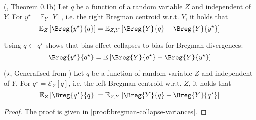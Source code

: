 \documentclass[../main.tex]{subfiles}
\begin{document}



\begin{lemma} \label{thm:bregman-collapse-bias} (\cite{pfau_GeneralizedBiasVarianceDecomposition_}, Theorem 0.1b)
    Let $q$ be a function of a random variable $Z$ and independent of $Y$. For $y^\star = \mathbb{E}_{Y}\left[ Y \right]$, i.e. the right Bregman centroid w.r.t. $Y$, it holds that
$$
\mathbb{E}_{Z}\left[ \Breg{y^\star}{q} \right]  = \mathbb{E}_{Z,Y}\left[ \Breg{Y}{q} - \Breg{Y}{y^\star} \right] 
$$
\end{lemma}

Using $q \gets q^\star$ shows that bias-effect collapses to bias for Bregman divergences: 
$$\Breg{y^\star}{q^\star} = \mathbb{E}_{}\left[ \Breg{Y}{q^\star} - \Breg{Y}{y^\star} \right]$$

\begin{lemma} \label{thm:bregman-collapse-variances} ($\star$, Generalised from \cite{wood_UnifiedTheoryDiversity_2023})
Let $q$ be a function of random variable $Z$ and independent of $Y$. For $q^\star = \mathcal{E}_{Z}\left[ q \right]$, i.e. the left Bregman centroid w.r.t. $Z$, it holds that
$$
\mathbb{E}_{Z}\left[ \Breg{q^\star}{q} \right] 
 = \mathbb{E}_{Z,Y}\left[ \Breg{Y}{q} - \Breg{Y}{q^\star} \right] 
$$
\end{lemma}
\begin{proof}
The proof is given in \cref{proof:bregman-collapse-variances}.
\end{proof}
\end{document}
